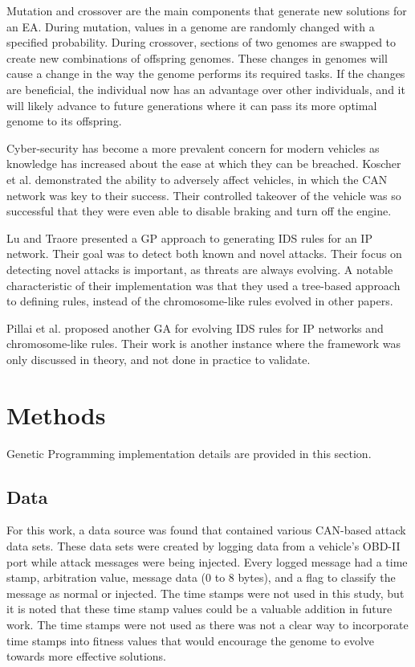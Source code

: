 \documentclass[10pt,conference]{IEEEtran}
\begin{document}
Mutation and crossover are the main components that generate new solutions for an EA.  During mutation, values in a genome are randomly changed with a specified probability.  During crossover, sections of two genomes are swapped to create new combinations of offspring genomes.  These changes in genomes will cause a change in the way the genome performs its required tasks.  If the changes are beneficial, the individual now has an advantage over other individuals, and it will likely advance to future generations where it can pass its more optimal genome to its offspring.  

Cyber-security has become a more prevalent concern for modern vehicles as knowledge has increased about the ease at which they can be breached.  Koscher et al. demonstrated the ability to adversely affect vehicles, in which the CAN network was key to their success\cite{koscher2010experimental}.  Their controlled takeover of the vehicle was so successful that they were even able to disable braking and turn off the engine.  

Lu and Traore presented a GP approach to generating IDS rules for an IP network\cite{lu2004detecting}.  Their goal was to detect both known and novel attacks.  Their focus on detecting novel attacks is important, as threats are always evolving.  A notable characteristic of their implementation was that they used a tree-based approach to defining rules, instead of the chromosome-like rules evolved in other papers\cite{hoque2012implementation}\cite{li2004using}.

Pillai et al. proposed another GA for evolving IDS rules for IP networks and chromosome-like rules\cite{pillai2004approach}.  Their work is another instance where the framework was only discussed in theory, and not done in practice to validate.  

\section{Methods}

Genetic Programming implementation details are provided in this section.

\subsection{Data}

For this work, a data source was found that contained various CAN-based attack data sets\cite{candata}.  These data sets were created by logging data from a vehicle's OBD-II port while attack messages were being injected.  Every logged message had a time stamp, arbitration value, message data (0 to 8 bytes), and a flag to classify the message as normal or injected.  The time stamps were not used in this study, but it is noted that these time stamp values could be a valuable addition in future work.  The time stamps were not used as there was not a clear way to incorporate time stamps into fitness values that would encourage the genome to evolve towards more effective solutions.
\end{document}
